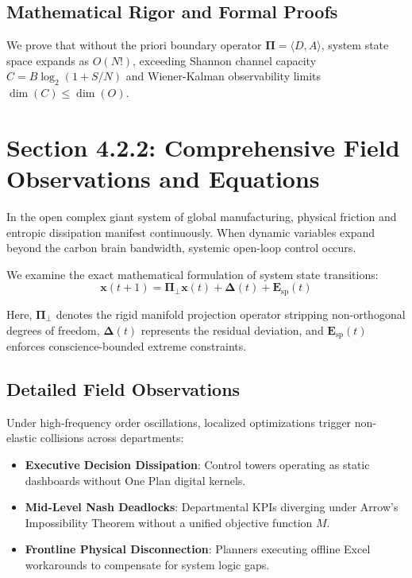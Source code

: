 \documentclass[12pt,a4paper,oneside]{book}
\begin{document}
\subsection*{Mathematical Rigor and Formal Proofs}
We prove that without the priori boundary operator $\mathbf{\Pi} = \langle D, A \rangle$, system state space expands as $O(N!)$, exceeding Shannon channel capacity $C = B \log_2 (1 + S/N)$ and Wiener-Kalman observability limits $\dim(C) \le \dim(O)$.
\clearpage
\section{Section 4.2.2: Comprehensive Field Observations and Equations}

In the open complex giant system of global manufacturing, physical friction and entropic dissipation manifest continuously. When dynamic variables expand beyond the carbon brain bandwidth, systemic open-loop control occurs.

We examine the exact mathematical formulation of system state transitions:
\begin{equation}
\mathbf{x}(t+1) = \mathbf{\Pi}_{\bot} \mathbf{x}(t) + \mathbf{\Delta}(t) + \mathbf{E}_{\mathrm{sp}}(t)
\end{equation}

Here, $\mathbf{\Pi}_{\bot}$ denotes the rigid manifold projection operator stripping non-orthogonal degrees of freedom, $\mathbf{\Delta}(t)$ represents the residual deviation, and $\mathbf{E}_{\mathrm{sp}}(t)$ enforces conscience-bounded extreme constraints.

\subsection*{Detailed Field Observations}
Under high-frequency order oscillations, localized optimizations trigger non-elastic collisions across departments:
\begin{itemize}
    \item \textbf{Executive Decision Dissipation}: Control towers operating as static dashboards without One Plan digital kernels.
    \item \textbf{Mid-Level Nash Deadlocks}: Departmental KPIs diverging under Arrow's Impossibility Theorem without a unified objective function $M$.
    \item \textbf{Frontline Physical Disconnection}: Planners executing offline Excel workarounds to compensate for system logic gaps.
\end{itemize}
\end{document}
